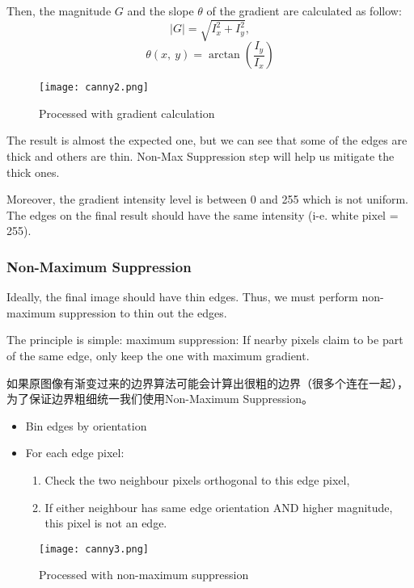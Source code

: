 \documentclass[11pt]{article}
\begin{document}
Then, the magnitude $G$ and the slope $\theta$ of the gradient are calculated as follow:
$$\left|G\right|=\sqrt{I_x^2+I_y^2},$$
$$\theta\left(x,\ y\right)=\arctan\left(\frac{I_y}{I_x}\right)$$

\begin{figure}[hbt!]
    \centering
    \texttt{[image: canny2.png]}
    \caption{Processed with gradient calculation}
\end{figure}


The result is almost the expected one, but we can see that some of the edges are thick and others are thin. Non-Max Suppression step will help us mitigate the thick ones.

Moreover, the gradient intensity level is between 0 and 255 which is not uniform. The edges on the final result should have the same intensity (i-e. white pixel = 255).


\subsubsection{Non-Maximum Suppression}
Ideally, the final image should have thin edges. Thus, we must perform non-maximum suppression to thin out the edges.

The principle is simple: maximum suppression: If nearby pixels claim to be
part of the same edge, only keep the one with
maximum gradient.

如果原图像有渐变过来的边界算法可能会计算出很粗的边界（很多个连在一起），为了保证边界粗细统一我们使用Non-Maximum Suppression。

\begin{itemize}
    \item Bin edges by orientation
    \item For each edge pixel:
          \begin{enumerate}
              \item Check the two neighbour pixels orthogonal to this edge pixel,
              \item If either neighbour has same edge orientation AND higher magnitude, this pixel is not an edge.
          \end{enumerate}
\end{itemize}

\begin{figure}[hbt!]
    \centering
    \texttt{[image: canny3.png]}
    \caption{Processed with non-maximum suppression}
\end{figure}
\end{document}
